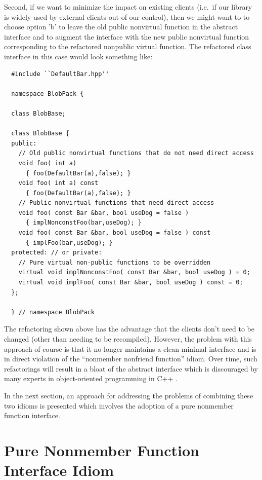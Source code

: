 \documentclass[pdf,ps2pdf,11pt]{SANDreport}
\begin{document}
Second, if we want to minimize the impact on existing clients (i.e.\ if our
library is widely used by external clients out of our control), then we might
want to to choose option 'b' to leave the old public nonvirtual function in
the abstract interface and to augment the interface with the new public
nonvirtual function corresponding to the refactored nonpublic virtual
function.  The refactored class interface in this case would look something
like:

{\small\begin{verbatim}
  #include ``DefaultBar.hpp''

  namespace BlobPack {

  class BlobBase;

  class BlobBase {
  public:
    // Old public nonvirtual functions that do not need direct access
    void foo( int a)
      { foo(DefaultBar(a),false); }
    void foo( int a) const
      { foo(DefaultBar(a),false); }
    // Public nonvirtual functions that need direct access
    void foo( const Bar &bar, bool useDog = false )
      { implNonconstFoo(bar,useDog); }
    void foo( const Bar &bar, bool useDog = false ) const
      { implFoo(bar,useDog); }
  protected: // or private:
    // Pure virtual non-public functions to be overridden
    virtual void implNonconstFoo( const Bar &bar, bool useDog ) = 0;
    virtual void implFoo( const Bar &bar, bool useDog ) const = 0;
  };

  } // namespace BlobPack
\end{verbatim}}

The refactoring shown above has the advantage that the clients don't need to
be changed (other than needing to be recompiled).  However, the problem with
this approach of course is that it no longer maintains a clean minimal
interface and is in direct violation of the ``nonmember nonfriend function''
idiom.  Over time, such refactorings will result in a bloat of the abstract
interface which is discouraged by many experts in object-oriented programming
in C++ {}\cite[Item 33]{C++CodingStandards05}.

In the next section, an approach for addressing the problems of combining
these two idioms is presented which involves the adoption of a pure nonmember
function interface.

%
\section{Pure Nonmember Function Interface Idiom}
%
\end{document}
